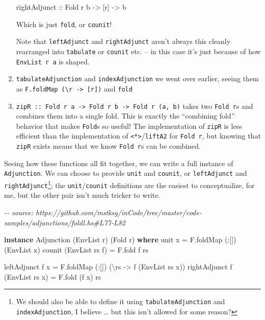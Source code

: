 \documentclass[]{article}
\newenvironment{Shaded}{}{}
\newcommand{\CommentTok}[1]{\textcolor[rgb]{0.38,0.63,0.69}{\textit{#1}}}
\newcommand{\DataTypeTok}[1]{\textcolor[rgb]{0.56,0.13,0.00}{#1}}
\newcommand{\KeywordTok}[1]{\textcolor[rgb]{0.00,0.44,0.13}{\textbf{#1}}}
\newcommand{\NormalTok}[1]{#1}
\newcommand{\OperatorTok}[1]{\textcolor[rgb]{0.40,0.40,0.40}{#1}}
\newcommand{\OtherTok}[1]{\textcolor[rgb]{0.00,0.44,0.13}{#1}}
\begin{document}
\begin{enumerate}
\begin{Shaded}
\begin{Highlighting}[]
\OtherTok{rightAdjunct\textquotesingle{} ::} \DataTypeTok{Fold}\NormalTok{ r b }\OtherTok{{-}>}\NormalTok{ [r] }\OtherTok{{-}>}\NormalTok{ b}
\end{Highlighting}
\end{Shaded}

  Which is just \texttt{fold}, or \texttt{counit}!

  Note that \texttt{leftAdjunct} and \texttt{rightAdjunct} aren't always this
  cleanly rearranged into \texttt{tabulate} or \texttt{counit} etc. -- in this
  case it's just because of how \texttt{EnvList\ r\ a} is shaped.
\item
  \texttt{tabulateAdjunction} and \texttt{indexAdjunction} we went over earlier,
  seeing them as
  \texttt{F.foldMap\ (\textbackslash{}r\ -\textgreater{}\ {[}r{]})} and
  \texttt{fold}
\item
  \texttt{zipR\ ::\ Fold\ r\ a\ -\textgreater{}\ Fold\ r\ b\ -\textgreater{}\ Fold\ r\ (a,\ b)}
  takes two \texttt{Fold\ r}s and combines them into a single fold. This is
  exactly the ``combining fold'' behavior that makes \texttt{Fold}s so useful!
  The implementation of \texttt{zipR} is less efficient than the implementation
  of \texttt{\textless{}*\textgreater{}}/\texttt{liftA2} for \texttt{Fold\ r},
  but knowing that \texttt{zipR} exists means that we know \texttt{Fold\ r}s can
  be combined.
\end{enumerate}

Seeing how these functions all fit together, we can write a full instance of
\texttt{Adjunction}. We can choose to provide \texttt{unit} and \texttt{counit},
or \texttt{leftAdjunct} and \texttt{rightAdjunct}\footnote{We should also be
  able to define it using \texttt{tabulateAdjunction} and
  \texttt{indexAdjunction}, I believe \ldots{} but this isn't allowed for some
  reason?}; the \texttt{unit}/\texttt{counit} definitions are the easiest to
conceptualize, for me, but the other pair isn't much tricker to write.

\begin{Shaded}
\begin{Highlighting}[]
\CommentTok{{-}{-} source: https://github.com/mstksg/inCode/tree/master/code{-}samples/adjunctions/foldl.hs\#L77{-}L82}

\KeywordTok{instance} \DataTypeTok{Adjunction}\NormalTok{ (}\DataTypeTok{EnvList}\NormalTok{ r) (}\DataTypeTok{Fold}\NormalTok{ r) }\KeywordTok{where}
\NormalTok{    unit x }\OtherTok{=}\NormalTok{ F.foldMap (}\OperatorTok{:}\NormalTok{[]) (}\OtherTok{\textasciigrave{}EnvList\textasciigrave{}}\NormalTok{ x)}
\NormalTok{    counit (}\DataTypeTok{EnvList}\NormalTok{ rs f) }\OtherTok{=}\NormalTok{ F.fold f rs}

\NormalTok{    leftAdjunct f x }\OtherTok{=}\NormalTok{ F.foldMap (}\OperatorTok{:}\NormalTok{[]) (\textbackslash{}rs }\OtherTok{{-}>}\NormalTok{ f (}\DataTypeTok{EnvList}\NormalTok{ rs x))}
\NormalTok{    rightAdjunct f (}\DataTypeTok{EnvList}\NormalTok{ rs x) }\OtherTok{=}\NormalTok{ F.fold (f x) rs}
\end{Highlighting}
\end{Shaded}
\end{document}
